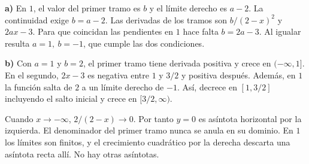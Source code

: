 \textbf{a)} En $1$, el valor del primer tramo es $b$ y el límite
derecho es $a-2$. La continuidad exige $b=a-2$. Las derivadas
de los tramos son $b/(2-x)^2$ y $2ax-3$. Para que coincidan
las pendientes en $1$ hace falta $b=2a-3$. Al igualar resulta
$\boxed{a=1,\ b=-1}$, que cumple las dos condiciones.

\textbf{b)} Con $a=1$ y $b=2$, el primer tramo tiene derivada
positiva y crece en $(-\infty,1]$. En el segundo, $2x-3$ es
negativa entre $1$ y $3/2$ y positiva después. Además, en
$1$ la función salta de $2$ a un límite derecho de $-1$.
Así, decrece en $[1,3/2]$ incluyendo el salto inicial y
crece en $[3/2,\infty)$.

Cuando $x\to-\infty$, $2/(2-x)\to0$. Por tanto $y=0$ es
asíntota horizontal por la izquierda. El denominador del primer
tramo nunca se anula en su dominio. En $1$ los límites son finitos,
y el crecimiento cuadrático por la derecha descarta una asíntota
recta allí. No hay otras asíntotas.
